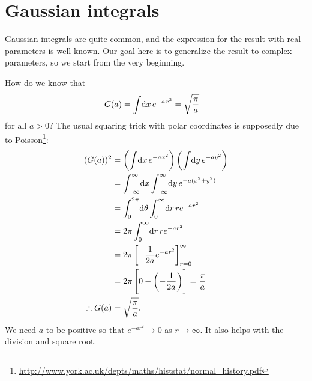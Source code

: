 \section{Gaussian integrals}

Gaussian integrals are quite common, and the expression for the result with real parameters is well-known.
Our goal here is to generalize the result to complex parameters, so we start from the very beginning.

How do we know that
\begin{align}
	G(a)
	&= \int\! \dif x \, e^{-a x^2}
	= \sqrt{\frac{\pi}{a}}
		\label{eq:gaussian-integral-a}
\end{align}
for all $a > 0$?
The usual squaring trick with polar coordinates is supposedly due to Poisson\footnote{
	\url{http://www.york.ac.uk/depts/maths/histstat/normal_history.pdf}
}:
\begin{subequations}
\begin{align}
	(G(a))^2
	&= \left( \int\! \dif x \, e^{-a x^2} \right) \left( \int\! \dif y \, e^{-a y^2} \right) \\
	&= \int_{-\infty}^\infty\! \dif x \int_{-\infty}^\infty\! \dif y \, e^{-a (x^2 + y^2)} \\
	&= \int_0^{2 \pi}\! \dif \theta \int_0^\infty\! \dif r \, r e^{-a r^2} \\
	&= 2 \pi \int_0^\infty\! \dif r \, r e^{-a r^2} \\
	&= 2 \pi \left[ -\frac{1}{2 a} e^{-a r^2} \right]_{r=0}^\infty \\
	&= 2 \pi \left[ 0 - \left( -\frac{1}{2 a} \right) \right]
	= \frac{\pi}{a} \\
	\therefore
	G(a)
	&= \sqrt{\frac{\pi}{a}}.
\end{align}
\end{subequations}
We need $a$ to be positive so that $e^{-a r^2} \to 0$ as $r \to \infty$.
It also helps with the division and square root.

